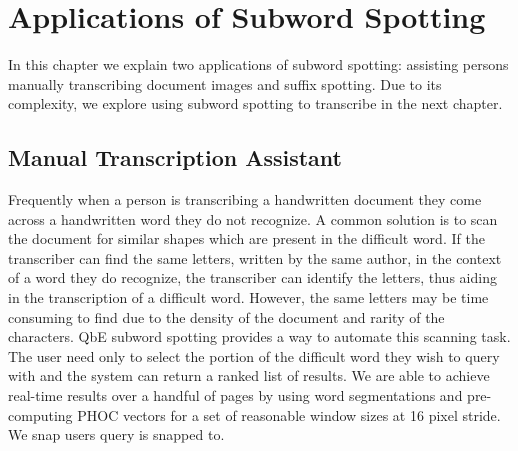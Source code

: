 \documentclass[ms,electronic,twosidetoc,letterpaper,chaptercenter,parttop,lof,lot]{byumsphd}
\begin{document}


\chapter{Applications of Subword Spotting}\label{applications}

In this chapter we explain two applications of subword spotting: assisting persons manually transcribing document images and suffix spotting. Due to its complexity, we explore using subword spotting to transcribe in the next chapter.

\section{Manual Transcription Assistant}
Frequently when a person is transcribing a handwritten document they come across a handwritten word they do not recognize. A common solution is to scan the document for similar shapes which are present in the difficult word. If the transcriber can find the same letters, written by the same author, in the context of a word they do recognize, the transcriber can identify the letters, thus aiding in the transcription of a difficult word. 
However, the same letters may be time consuming to find due to the density of the document and rarity of the characters. QbE subword spotting provides a way to automate this scanning task. The user need only to select the portion of the difficult word they wish to query with and the system can return a ranked list of results.
We are able to achieve real-time results over a handful of pages by using word segmentations and pre-computing PHOC vectors for a set of reasonable window sizes at 16  pixel stride. We snap users query is snapped to. 
\end{document}
